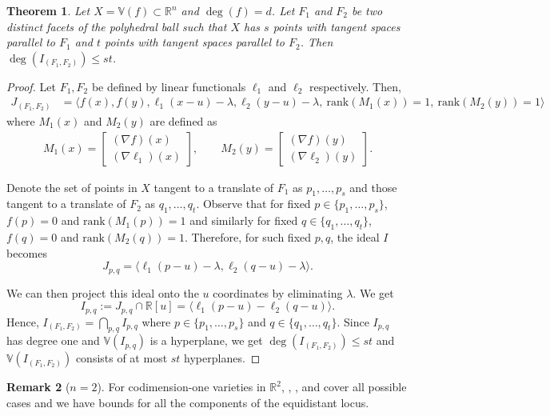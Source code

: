 \documentclass{article}
\newtheorem{theorem}{Theorem}
\numberwithin{theorem}{section}
\theoremstyle{definition}
\newtheorem{remark}[theorem]{Remark}
\theoremstyle{example_contd}
\newcommand{\RR}{\mathbb{R}}
\newcommand{\IF}{I_{(F_1,F_2)}}
\newcommand{\JF}{J_{(F_1,F_2)}}
\newcommand{\V}{{\mathbb{V}}}
\begin{document}
\begin{theorem}\label{thm:facet-facet}
Let $X=\V(f)\subset \RR^n$ and $\deg(f) = d$. Let $F_1$ and $F_2$ be two distinct facets of the polyhedral ball such that $X$ has $s$ points with tangent spaces parallel to $F_1$ and $t$ points with tangent spaces parallel to $F_2$. Then $\deg(\IF)\leq st$.
\end{theorem}
\begin{proof}
	Let $F_1, F_2$ be defined by linear functionals $\ell_1$ and $\ell_2$ respectively. Then, 
	\begin{align*}
		\JF &= \langle f(x), f(y), \ell_1(x - u) - \lambda, \ell_2(y-u) - \lambda, \ \text{rank}(M_1(x)) = 1, \ \text{rank}(M_2(y)) = 1 \rangle
	\end{align*}
	where $M_1(x)$ and $M_2(y)$ are defined as
	\begin{align*}
		M_1(x) = \begin{bmatrix}
			(\nabla f)(x) \\
			(\nabla \ell_1)(x)
		\end{bmatrix}, \qquad M_2(y) = \begin{bmatrix}
			(\nabla f)(y) \\
			(\nabla \ell_2)(y)
		\end{bmatrix}.
	\end{align*}
	
	Denote the set of points in $X$ tangent to a translate of $F_1$ as $p_1,\ldots,p_s$ and those tangent to a translate of $F_2$ as $q_1,\ldots,q_t$. Observe that for fixed $p \in \{p_1,\ldots, p_s\}$, $f(p) = 0$ and $\text{rank}(M_1(p)) = 1$ and similarly for fixed $q \in \{q_1,\ldots, q_t\}$, $f(q) = 0$ and $\text{rank}(M_2(q)) = 1$. Therefore, for such fixed $p,q$, the ideal $I$ becomes
	\[ J_{p,q} = \langle \ell_1(p-u) - \lambda, \ell_2(q - u) - \lambda  \rangle.  \]
	
	We can then project this ideal onto the $u$ coordinates by eliminating $\lambda$. We get
	\[I_{p,q}:=J_{p,q}\cap \RR[u]= \langle \ell_1(p-u) - \ell_2(q-u) \rangle. \]
	Hence, $\IF=\bigcap_{p,q}I_{p,q}$ where $p \in \{p_1,\ldots, p_s\}$ and $q \in \{q_1,\ldots,q_t\}$. Since $I_{p,q}$ has degree one and $\V(I_{p,q})$ is a hyperplane, we get $\deg(\IF)\leq st$ and  $\V(\IF)$ consists of at most $st$ hyperplanes.
\end{proof}

\begin{remark}[$n=2$]
	For codimension-one varieties in $\RR^2$, , , and  cover all possible cases and we have bounds for all the components of the equidistant locus.
\end{remark}
\end{document}
